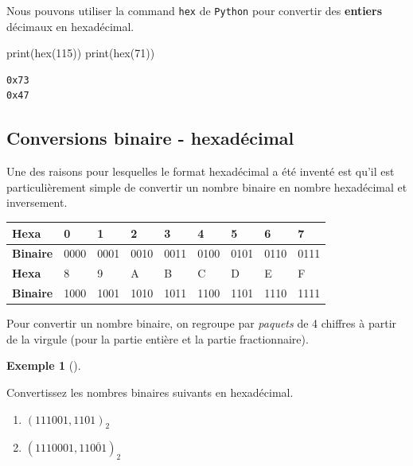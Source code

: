 \documentclass[
  letterpaper,
]{scrbook}
\newenvironment{Shaded}{\begin{snugshade}}{\end{snugshade}}
\newcommand{\BuiltInTok}[1]{\textcolor[rgb]{0.00,0.50,0.00}{#1}}
\newcommand{\DecValTok}[1]{\textcolor[rgb]{0.25,0.63,0.44}{#1}}
\newcommand{\NormalTok}[1]{\textcolor[rgb]{0.00,0.44,0.13}{#1}}
\providecommand{\tightlist}{%
  \setlength{\itemsep}{0pt}\setlength{\parskip}{0pt}}\usepackage{longtable,booktabs,array}
\theoremstyle{plain}
\theoremstyle{definition}
\theoremstyle{definition}
\newtheorem{example}{Exemple}[chapter]
\theoremstyle{remark}
\begin{document}
Nous pouvons utiliser la command \texttt{hex} de \texttt{Python} pour
convertir des \textbf{entiers} décimaux en hexadécimal.

\hypertarget{conversion-hexadecimal}{}
\begin{Shaded}
\begin{Highlighting}[]
\BuiltInTok{print}\NormalTok{(}\BuiltInTok{hex}\NormalTok{(}\DecValTok{115}\NormalTok{))}
\BuiltInTok{print}\NormalTok{(}\BuiltInTok{hex}\NormalTok{(}\DecValTok{71}\NormalTok{))}
\end{Highlighting}
\end{Shaded}

\begin{verbatim}
0x73
0x47
\end{verbatim}

\hypertarget{conversions-binaire---hexaduxe9cimal}{%
\subsection{Conversions binaire -
hexadécimal}\label{conversions-binaire---hexaduxe9cimal}}

Une des raisons pour lesquelles le format hexadécimal a été inventé est
qu'il est particulièrement simple de convertir un nombre binaire en
nombre hexadécimal et inversement.

\begin{longtable}[]{@{}lllllllll@{}}
\toprule\noalign{}
\textbf{Hexa} & 0 & 1 & 2 & 3 & 4 & 5 & 6 & 7 \\
\midrule\noalign{}
\endhead
\bottomrule\noalign{}
\endlastfoot
\textbf{Binaire} & 0000 & 0001 & 0010 & 0011 & 0100 & 0101 & 0110 &
0111 \\
\textbf{Hexa} & 8 & 9 & A & B & C & D & E & F \\
\textbf{Binaire} & 1000 & 1001 & 1010 & 1011 & 1100 & 1101 & 1110 &
1111 \\
\end{longtable}

Pour convertir un nombre binaire, on regroupe par \emph{paquets} de 4
chiffres à partir de la virgule (pour la partie entière et la partie
fractionnaire).

\begin{example}[]\protect\hypertarget{exm-conversion-binaire-hexadecimal}{}\label{exm-conversion-binaire-hexadecimal}

Convertissez les nombres binaires suivants en hexadécimal.

\begin{enumerate}
\def\labelenumi{\alph{enumi})}
\tightlist
\item
  \((111001,1101)_2\)
\item
  \((1110001,11\overline{001})_2\)
\end{enumerate}

\end{example}
\end{document}
